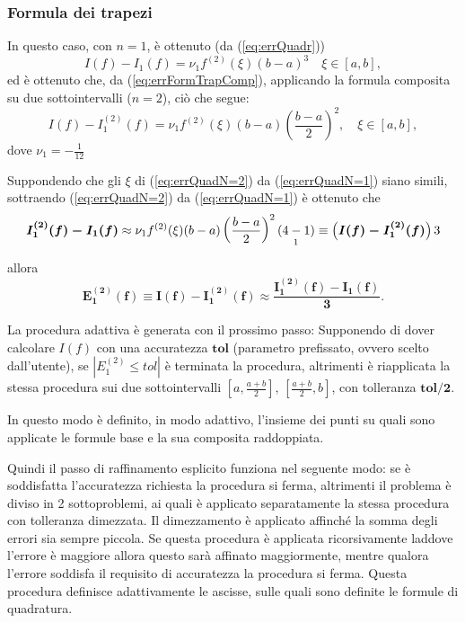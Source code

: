 \subsubsection{Formula dei trapezi}
In questo caso, con $n=1$, è ottenuto (da (\ref{eq:errQuadr}))
\begin{equation}\label{eq:errQuadN=1}
    I(f)-I_1(f)=\nu_1 f^{(2)}(\xi)(b-a)^3\quad \xi\in[a,b],
\end{equation}
ed è ottenuto che, da (\ref{eq:errFormTrapComp}), applicando la formula composita su due sottointervalli ($n=2$), ciò che segue:\begin{equation}\label{eq:errQuadN=2}
    I(f)-I_1^{(2)}(f)=\nu_1 f^{(2)}(\xi)(b-a)\left(\frac{b-a}{2}\right)^2,\quad \xi\in [a,b],
\end{equation}
dove $\nu_1=-\frac{1}{12}$

Suppondendo che gli $\xi$ di (\ref{eq:errQuadN=2}) da (\ref{eq:errQuadN=1}) siano simili, sottraendo (\ref{eq:errQuadN=2}) da (\ref{eq:errQuadN=1}) è ottenuto che
\begin{equation*}
    \boldsymbol{I_1^{(2)}(f)-I_1(f)}\approx\nu_1 f^{(2)}(\xi)(b-a)\left(\frac{b-a}{2}\right)^2\underset{\footnotemark}{(4-1)}\equiv \left(\boldsymbol{I(f)-I_1^{(2)}(f)}\right) 3
\end{equation*}
allora
\begin{equation*}
    \boldsymbol{E_1^{(2)}(f)\equiv I(f)-I_1^{(2)}(f)\approx\frac{I_1^{(2)}(f)-I_1(f)}{3}}.
\end{equation*}


La procedura adattiva è generata con il prossimo passo: Supponendo di dover calcolare $I(f)$ con una accuratezza $\boldsymbol{tol}$ (parametro prefissato, ovvero scelto dall'utente), se $\left|E_1^{(2)}\leq tol\right|$ è terminata la procedura, altrimenti è riapplicata la stessa procedura sui due sottointervalli $\left[a,\frac{a+b}{2}\right],\, \left[\frac{a+b}{2},b\right]$, con tolleranza $\boldsymbol{tol/2}$.

In questo modo è definito, in modo adattivo, l'insieme dei punti su quali sono applicate le formule base e la sua composita raddoppiata.

Quindi il passo di raffinamento esplicito funziona nel seguente modo: se è soddisfatta l'accuratezza richiesta la procedura si ferma, altrimenti il problema è diviso in 2 sottoproblemi, ai quali è applicato separatamente la stessa procedura con tolleranza dimezzata. Il dimezzamento è applicato affinché la somma degli errori sia sempre piccola. Se questa procedura è applicata ricorsivamente laddove l'errore è maggiore allora questo sarà affinato maggiormente, mentre qualora l'errore soddisfa il requisito di accuratezza la procedura si ferma. Questa procedura definisce adattivamente le ascisse, sulle quali sono definite le formule di quadratura.

